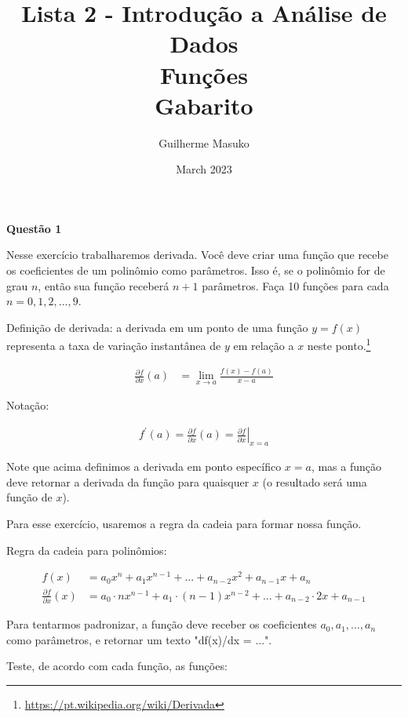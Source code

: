 \documentclass[12pt, a4paper]{article}
\title{Lista 2 - Introdução a Análise de Dados \\
Funções \\
Gabarito}
\author{Guilherme Masuko}
\date{March 2023}
\begin{document}
	
\clearpage
\maketitle
\thispagestyle{empty}

\textbf{Questão 1}

Nesse exercício trabalharemos derivada. Você deve criar uma função que recebe os coeficientes de um polinômio como parâmetros. Isso é, se o polinômio for de grau $n$, então sua função receberá $n+1$ parâmetros. Faça 10 funções para cada $n = 0, 1, 2,..., 9$. 

Definição de derivada: a derivada em um ponto de uma função $y = f(x)$ representa a taxa de variação instantânea de $y$ em relação a $x$ neste ponto.\footnote{\url{https://pt.wikipedia.org/wiki/Derivada}}

\begin{align*}
	\frac{\partial f}{\partial x}(a) &= \lim_{x \rightarrow a} \frac{f(x)-f(a)}{x-a}
\end{align*}

Notação:

\begin{align*}
	f^{\prime}(a)=\frac{\partial f}{\partial x}(a)=\left.\frac{\partial f}{\partial x}\right|_{x=a}
\end{align*}

Note que acima definimos a derivada em ponto específico $x=a$, mas a função deve retornar a derivada da função para quaisquer $x$ (o resultado será uma função de $x$).

Para esse exercício, usaremos a regra da cadeia para formar nossa função. 

Regra da cadeia para polinômios:

\begin{align*}
	f(x) &= a_0 x^n + a_{1} x^{n-1} + ... + a_{n-2} x^2 + a_{n-1} x + a_n \\
	\frac{\partial f}{\partial x}(x) &= a_0\cdot n x^{n-1} + a_1\cdot (n-1) x^{n-2} + ... + a_{n-2}\cdot 2 x + a_{n-1}
\end{align*}


Para tentarmos padronizar, a função deve receber os coeficientes $a_0, a_1, ..., a_n$ como parâmetros, e retornar um texto "df(x)/dx = ...".

Teste, de acordo com cada função, as funções:
\end{document}
